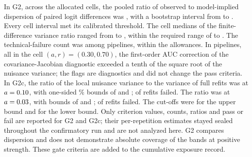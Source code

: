 In G2, across the  allocated cells, the pooled ratio of observed to model-implied dispersion of paired logit differences was , with a bootstrap interval from  to . Every cell interval met its calibrated threshold. The cell medians of the finite-difference variance ratio ranged from  to , within the required range of  to . The technical-failure count was  among  pipelines, within the allowances. In  pipelines, all in the cell $(a,r)=(0.30,0.70)$, the first-order AUC correction of the covariance-Jacobian diagnostic exceeded a tenth of the square root of the nuisance variance; the flags are diagnostics and did not change the pass criteria.
In G2c, the ratio of the local nuisance variance to the variance of full refits was  at $a=\resultnum{v4.protocol.a.010}{0.10}$, with one-sided \% bounds of  and ;  of  refits failed. The ratio was  at $a=\resultnum{v4.protocol.a.003}{0.03}$, with bounds of  and ;  of  refits failed. The cut-offs were  for the upper bound and  for the lower bound.
Only criterion values, counts, ratios and pass or fail are reported for G2 and G2c; their per-repetition estimates stayed sealed throughout the confirmatory run and are not analyzed here. G2 compares dispersion and does not demonstrate absolute coverage of the bands at positive strength. These gate criteria are added to the cumulative exposure record.

